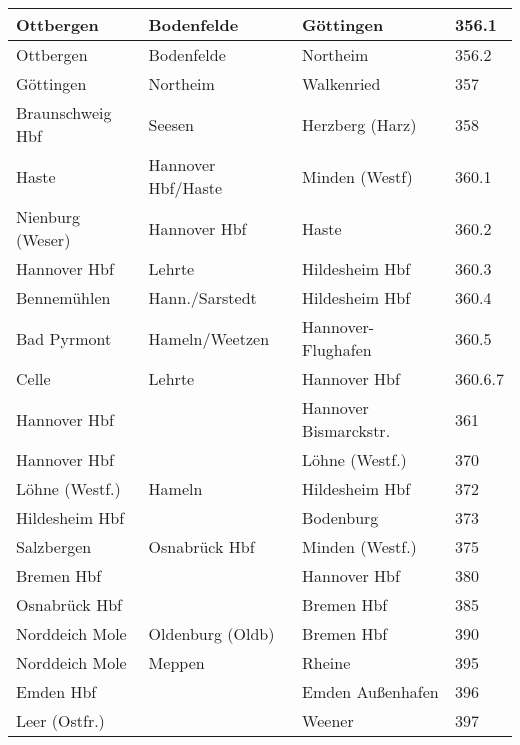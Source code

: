 \begin{tabular}{|l|l|l|p{2cm}|}
Ottbergen & Bodenfelde & Göttingen & 356.1 \\ \hline
Ottbergen & Bodenfelde & Northeim & 356.2 \\ \hline
Göttingen & Northeim & Walkenried & 357 \footnotemark[1] \\ \hline
Braunschweig Hbf & Seesen & Herzberg (Harz) & 358 \\ \hline
Haste & Hannover Hbf/Haste & Minden (Westf) & 360.1 \\ \hline
Nienburg (Weser) & Hannover Hbf & Haste & 360.2 \\ \hline
Hannover Hbf & Lehrte & Hildesheim Hbf & 360.3 \\ \hline
Bennemühlen & Hann./Sarstedt & Hildesheim Hbf & 360.4 \\ \hline
Bad Pyrmont & Hameln/Weetzen & Hannover-Flughafen & 360.5 \\ \hline
Celle & Lehrte & Hannover Hbf & 360.6.7 \\ \hline
Hannover Hbf &  & Hannover Bismarckstr. & 361 \footnotemark[1] \\ \hline
Hannover Hbf &  & Löhne (Westf.) & 370 \\ \hline
Löhne (Westf.) & Hameln & Hildesheim Hbf & 372 \\ \hline
Hildesheim Hbf &  & Bodenburg & 373 \\ \hline
Salzbergen & Osnabrück Hbf & Minden (Westf.) & 375 \footnotemark[1] \\ \hline
Bremen Hbf &  & Hannover Hbf & 380 \\ \hline
Osnabrück Hbf &  & Bremen Hbf & 385 \footnotemark[1] \\ \hline
Norddeich Mole & Oldenburg (Oldb) & Bremen Hbf & 390 \footnotemark[1] \\ \hline
Norddeich Mole & Meppen & Rheine & 395 \footnotemark[1] \\ \hline
Emden Hbf &  & Emden Außenhafen & 396 \\ \hline
Leer (Ostfr.) &  & Weener & 397 \\ \hline
\end{tabular}

\label{streckenliste1}

